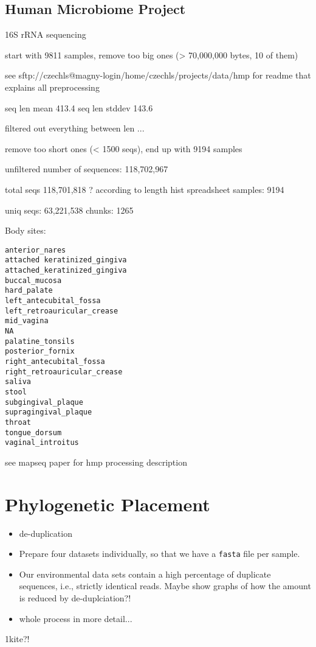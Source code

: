 \subsection{Human Microbiome Project}
\label{sec:MetagenomicDatasets:sub:HumanMicrobiomeProject}

16S rRNA sequencing

start with 9811 samples, remove too big ones (> 70,000,000 bytes, 10 of them)

see sftp://czechls@magny-login/home/czechls/projects/data/hmp
for readme that explains all preprocessing

seq len mean 413.4
seq len stddev 143.6

filtered out everything between len ...

remove too short ones (< 1500 seqs), end up with 9194 samples

unfiltered number of sequences: 118,702,967

total seqs 118,701,818 ? according to length hist spreadsheet
samples: 9194

uniq seqs: 63,221,538
chunks: 1265

Body sites:

\begin{verbatim}
anterior_nares
attached keratinized_gingiva
attached_keratinized_gingiva
buccal_mucosa
hard_palate
left_antecubital_fossa
left_retroauricular_crease
mid_vagina
NA
palatine_tonsils
posterior_fornix
right_antecubital_fossa
right_retroauricular_crease
saliva
stool
subgingival_plaque
supragingival_plaque
throat
tongue_dorsum
vaginal_introitus
\end{verbatim}

see mapseq paper for hmp processing description



\section{Phylogenetic Placement}
\label{sec:PhylogeneticPlacement}

\begin{itemize}
    \item de-duplication
    \item Prepare four datasets individually, so that we have a \texttt{fasta} file per sample.
    \item Our environmental data sets contain a high percentage of duplicate sequences, i.e., strictly identical reads.
    Maybe show graphs of how the amount is reduced by de-duplciation?!
    \item whole process in more detail...
\end{itemize}


1kite?!

